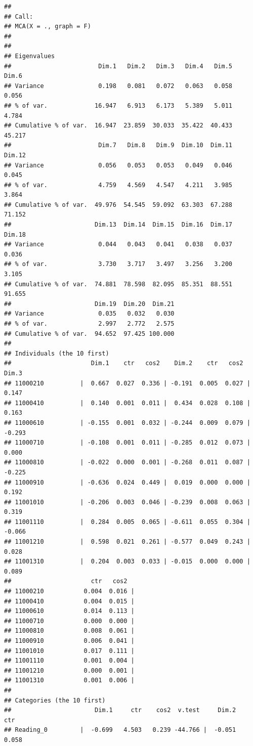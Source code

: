 \documentclass[]{book}
\begin{document}
\begin{verbatim}
## 
## Call:
## MCA(X = ., graph = F) 
## 
## 
## Eigenvalues
##                        Dim.1   Dim.2   Dim.3   Dim.4   Dim.5   Dim.6
## Variance               0.198   0.081   0.072   0.063   0.058   0.056
## % of var.             16.947   6.913   6.173   5.389   5.011   4.784
## Cumulative % of var.  16.947  23.859  30.033  35.422  40.433  45.217
##                        Dim.7   Dim.8   Dim.9  Dim.10  Dim.11  Dim.12
## Variance               0.056   0.053   0.053   0.049   0.046   0.045
## % of var.              4.759   4.569   4.547   4.211   3.985   3.864
## Cumulative % of var.  49.976  54.545  59.092  63.303  67.288  71.152
##                       Dim.13  Dim.14  Dim.15  Dim.16  Dim.17  Dim.18
## Variance               0.044   0.043   0.041   0.038   0.037   0.036
## % of var.              3.730   3.717   3.497   3.256   3.200   3.105
## Cumulative % of var.  74.881  78.598  82.095  85.351  88.551  91.655
##                       Dim.19  Dim.20  Dim.21
## Variance               0.035   0.032   0.030
## % of var.              2.997   2.772   2.575
## Cumulative % of var.  94.652  97.425 100.000
## 
## Individuals (the 10 first)
##                      Dim.1    ctr   cos2    Dim.2    ctr   cos2    Dim.3
## 11000210          |  0.667  0.027  0.336 | -0.191  0.005  0.027 |  0.147
## 11000410          |  0.140  0.001  0.011 |  0.434  0.028  0.108 |  0.163
## 11000610          | -0.155  0.001  0.032 | -0.244  0.009  0.079 | -0.293
## 11000710          | -0.108  0.001  0.011 | -0.285  0.012  0.073 |  0.000
## 11000810          | -0.022  0.000  0.001 | -0.268  0.011  0.087 | -0.225
## 11000910          | -0.636  0.024  0.449 |  0.019  0.000  0.000 |  0.192
## 11001010          | -0.206  0.003  0.046 | -0.239  0.008  0.063 |  0.319
## 11001110          |  0.284  0.005  0.065 | -0.611  0.055  0.304 | -0.066
## 11001210          |  0.598  0.021  0.261 | -0.577  0.049  0.243 |  0.028
## 11001310          |  0.204  0.003  0.033 | -0.015  0.000  0.000 |  0.089
##                      ctr   cos2  
## 11000210           0.004  0.016 |
## 11000410           0.004  0.015 |
## 11000610           0.014  0.113 |
## 11000710           0.000  0.000 |
## 11000810           0.008  0.061 |
## 11000910           0.006  0.041 |
## 11001010           0.017  0.111 |
## 11001110           0.001  0.004 |
## 11001210           0.000  0.001 |
## 11001310           0.001  0.006 |
## 
## Categories (the 10 first)
##                       Dim.1     ctr    cos2  v.test     Dim.2     ctr
## Reading_0         |  -0.699   4.503   0.239 -44.766 |  -0.051   0.058

\end{verbatim}
\end{document}

